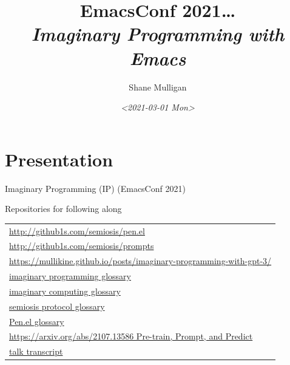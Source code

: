\documentclass[presentation]{beamer}
\author{Shane Mulligan \\  }
\date{\textit{<2021-03-01 Mon>}}
\title{EmacsConf 2021\ldots{} \\   \emph{\alert{Imaginary Programming with Emacs}} \\  }
\begin{document}
\maketitle

\section{Presentation}
\label{sec:org6be25f2}
\begin{frame}[label={sec:org585e294}]{Imaginary Programming (IP) (EmacsConf 2021)}
\begin{block}{Repositories for following along}
{\tiny
\begin{center}
\begin{tabular}{l}
\url{http://github1s.com/semiosis/pen.el}\\
\url{http://github1s.com/semiosis/prompts}\\
\url{https://mullikine.github.io/posts/imaginary-programming-with-gpt-3/}\\
\href{http://github.com/semiosis/glossaries-gh/blob/master/imaginary-programming.txt}{imaginary programming glossary}\\
\href{http://github.com/semiosis/glossaries-gh/blob/master/imaginary-computing.txt}{imaginary computing glossary}\\
\href{http://github.com/semiosis/glossaries-gh/blob/master/semiosis-protocol.txt}{semiosis protocol glossary}\\
\href{http://github.com/semiosis/glossaries-gh/blob/master/pen.el.txt}{Pen.el glossary}\\
\href{https://arxiv.org/abs/2107.13586}{https://arxiv.org/abs/2107.13586 Pre-train, Prompt, and Predict}\\
\href{http://github1s.com/mullikine/imaginary-programming-transcript-emacsconf-2021}{talk transcript}\\
\end{tabular}
\end{center}
}
\end{block}
\end{frame}
\end{document}
